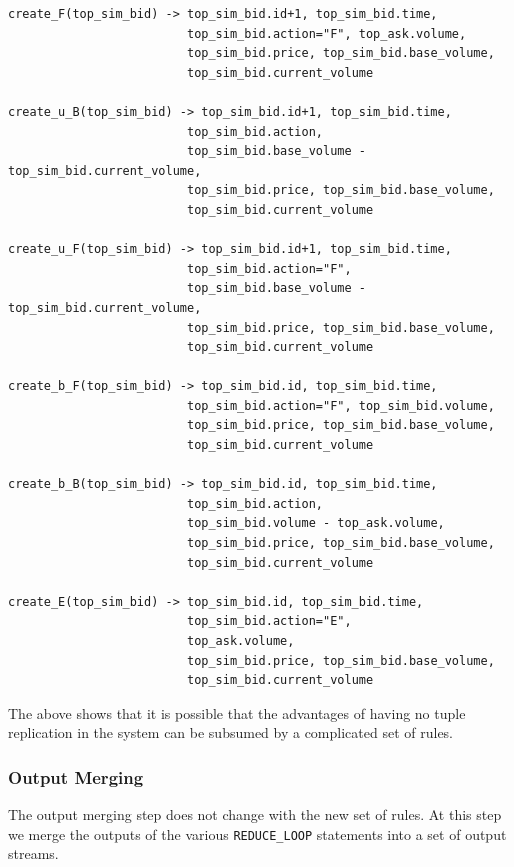 \documentclass{article}
\begin{document}
\begin{verbatim}
create_F(top_sim_bid) -> top_sim_bid.id+1, top_sim_bid.time,
                         top_sim_bid.action="F", top_ask.volume,
                         top_sim_bid.price, top_sim_bid.base_volume, 
                         top_sim_bid.current_volume

create_u_B(top_sim_bid) -> top_sim_bid.id+1, top_sim_bid.time,
                         top_sim_bid.action, 
                         top_sim_bid.base_volume - top_sim_bid.current_volume,
                         top_sim_bid.price, top_sim_bid.base_volume, 
                         top_sim_bid.current_volume

create_u_F(top_sim_bid) -> top_sim_bid.id+1, top_sim_bid.time,
                         top_sim_bid.action="F", 
                         top_sim_bid.base_volume - top_sim_bid.current_volume,
                         top_sim_bid.price, top_sim_bid.base_volume, 
                         top_sim_bid.current_volume

create_b_F(top_sim_bid) -> top_sim_bid.id, top_sim_bid.time,
                         top_sim_bid.action="F", top_sim_bid.volume,
                         top_sim_bid.price, top_sim_bid.base_volume, 
                         top_sim_bid.current_volume

create_b_B(top_sim_bid) -> top_sim_bid.id, top_sim_bid.time,
                         top_sim_bid.action, 
                         top_sim_bid.volume - top_ask.volume, 
                         top_sim_bid.price, top_sim_bid.base_volume, 
                         top_sim_bid.current_volume
                     
create_E(top_sim_bid) -> top_sim_bid.id, top_sim_bid.time,
                         top_sim_bid.action="E", 
                         top_ask.volume,
                         top_sim_bid.price, top_sim_bid.base_volume, 
                         top_sim_bid.current_volume
\end{verbatim}

\noindent The above shows that it is possible that the advantages of having no tuple replication in the system can be subsumed by a complicated set of rules.

\subsubsection{Output Merging}

The output merging step does not change with the new set of rules. At this step we merge the outputs of the various {\tt REDUCE\_LOOP} statements into a set of output streams.
\end{document}
